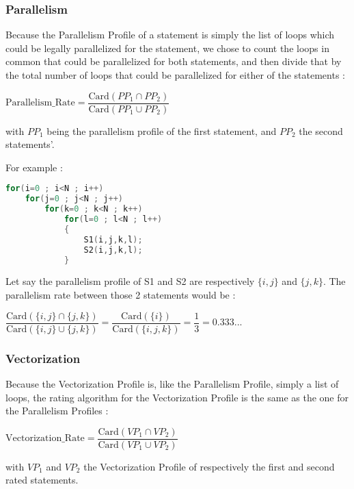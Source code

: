 \documentclass[paper=a4, fontsize=11.5pt]{scrartcl}
\numberwithin{equation}{section}        %
\numberwithin{figure}{section}          %
\numberwithin{table}{section}               %
\begin{document}
        \subsubsection{Parallelism}
            Because the Parallelism Profile of a statement is simply the list of loops
            which could be legally parallelized for the statement, we chose to count the
            loops in common that could be parallelized for both statements, and then
            divide that by the total number of loops that could be parallelized for either
            of the statements :
            \begin{center}
                $ \mathrm{Parallelism\_Rate} =  \dfrac{\mathrm{Card}( {PP_1} \cap {PP_2})}{\mathrm{Card}({PP_1} \cup {PP_2})}$
            \end{center}
            with $PP_1$ being the parallelism profile of the first statement, and $PP_2$ 
            the second statements'.

            \bigskip

            For example :
\begin{lstlisting}[frame=single, language=C, caption={Parallelism Profile Rating Example}, label={lst:pp_example}]
for(i=0 ; i<N ; i++)
    for(j=0 ; j<N ; j++)
        for(k=0 ; k<N ; k++)
            for(l=0 ; l<N ; l++)
            {
                S1(i,j,k,l);
                S2(i,j,k,l);
            }
\end{lstlisting}
        Let say the parallelism profile of S1 and S2 are respectively $\{i,j\}$ and $\{j,k\}$.
        The parallelism rate between those 2 statements would be :
        \begin{center}
            $\dfrac{\mathrm{Card}( \{i,j\} \cap \{j,k\})}{\mathrm{Card}( \{i,j\} \cup \{j,k\})}
            = \dfrac{\mathrm{Card}( \{i\})}{\mathrm{Card}( \{i,j,k\})}
            = \dfrac{1}{3}
            = 0.333...$
        \end{center}

        \subsubsection{Vectorization}
            Because the Vectorization Profile is, like the Parallelism Profile, 
            simply a list of loops, the rating algorithm for the Vectorization Profile
            is the same as the one for the Parallelism Profiles :
            \begin{center}
                $ \mathrm{Vectorization\_Rate} =  \dfrac{\mathrm{Card}( {VP_1} \cap {VP_2})}{\mathrm{Card}({VP_1} \cup {VP_2})}$
            \end{center}
            with $VP_1$ and $VP_2$ the Vectorization Profile of respectively the first and second rated statements.
\end{document}
